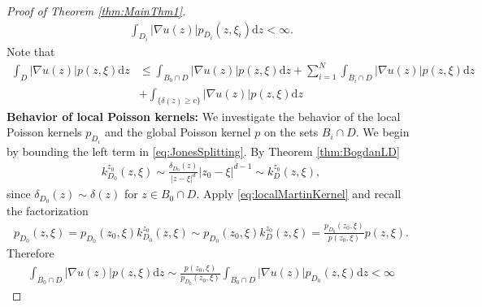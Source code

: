 \documentclass[a4paper,12pt]{article}
\theoremstyle{definition}
\theoremstyle{definition}
\begin{document}
\begin{proof}[Proof of Theorem \ref{thm:MainThm1}]
		\begin{align}
			\int_{D_i}|\nabla u(z)|p_{D_i}(z,\xi_i)\mathrm dz<\infty.
		\end{align}
		Note that
		\begin{align}\label{eq:JonesSplitting}
			\int_{D}|\nabla u(z)|p(z,\xi)\mathrm dz&\leq\int_{B_0\cap D}|\nabla u(z)|p(z,\xi)\mathrm dz+ \sum_{i=1}^{N}\int_{B_i\cap D}|\nabla u(z)|p(z,\xi)\mathrm dz\\
			&+\int_{\lbrace\delta(z)\geq c\rbrace}|\nabla u(z)|p(z,\xi)\mathrm dz\label{eq:finiteIntegral}
		\end{align}
		\textbf{Behavior of local Poisson kernels:} We investigate the behavior of the local Poisson kernels $p_{D_i}$ and the global Poisson kernel $p$ on the sets $B_i\cap D$. We begin by bounding the left term in \eqref{eq:JonesSplitting}.
	 	By Theorem \ref{thm:BogdanLD}
		\begin{align}\label{eq:localMartinKernel}
			k^{z_0}_{D_0}(z,\xi)\sim\frac{\delta_{D_0}(z)}{|z-\xi|^d}|z_0-\xi|^{d-1}\sim k^{z_0}_{D}(z,\xi),
		\end{align}
		since $\delta_{D_0}(z)\sim\delta(z)$ for $z\in B_0\cap D$.
		Apply \eqref{eq:localMartinKernel} and recall the factorization 
		\begin{align*}
			p_{D_0}(z,\xi)=p_{D_0}(z_0,\xi) k^{z_0}_{D_0}(z,\xi)\sim p_{D_0}(z_0,\xi)k^{z_0}_{D}(z,\xi) = \frac{p_{D_0}(z_0,\xi)}{p(z_0,\xi)} p(z,\xi).
		\end{align*} 
		Therefore 
		\begin{align}
			\int_{B_0\cap D}|\nabla u(z)|p(z,\xi)\mathrm dz \sim \frac{p(z_0,\xi)}{p_{D_0}(z_0,\xi)} \int_{B_0\cap D}|\nabla u(z)|p_{D_0}(z,\xi)\mathrm dz<\infty
		\end{align}
		

\end{proof}
\end{document}
